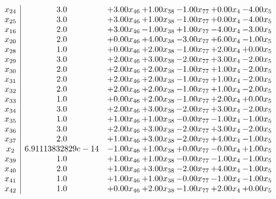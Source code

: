 \documentclass[8pt]{article}
\begin{document}
\[\begin{array}{c| c c@{\hskip 2pt} c@{\hskip 2pt} c@{\hskip 2pt} c@{\hskip 2pt} c@{\hskip 2pt} }
 x_{24}   &  3.0 & +  3.00 x_{46} & +  1.00 x_{38} & -1.00 x_{77} & +  0.00 x_{4} & -4.00 x_{5}\\
 x_{25}   &  3.0 & +  3.00 x_{46} & +  1.00 x_{38} & -1.00 x_{77} & +  0.00 x_{4} & -4.00 x_{5}\\
 x_{16}   &  2.0 & +  3.00 x_{46} & -1.00 x_{38} & +  1.00 x_{77} & -4.00 x_{4} & -3.00 x_{5}\\
 x_{20}   &  2.0 & +  0.00 x_{46} & +  4.00 x_{38} & -3.00 x_{77} & +  6.00 x_{4} & -1.00 x_{5}\\
 x_{28}   &  1.0 & +  0.00 x_{46} & +  2.00 x_{38} & -1.00 x_{77} & +  2.00 x_{4} & +  0.00 x_{5}\\
 x_{29}   &  3.0 & +  2.00 x_{46} & +  3.00 x_{38} & -2.00 x_{77} & +  3.00 x_{4} & -2.00 x_{5}\\
 x_{30}   &  2.0 & +  2.00 x_{46} & +  2.00 x_{38} & -1.00 x_{77} & +  1.00 x_{4} & -2.00 x_{5}\\
 x_{31}   &  2.0 & +  2.00 x_{46} & +  2.00 x_{38} & -1.00 x_{77} & +  1.00 x_{4} & -2.00 x_{5}\\
 x_{32}   &  2.0 & +  2.00 x_{46} & +  2.00 x_{38} & -1.00 x_{77} & +  1.00 x_{4} & -2.00 x_{5}\\
 x_{33}   &  1.0 & +  0.00 x_{46} & +  2.00 x_{38} & -1.00 x_{77} & +  2.00 x_{4} & +  0.00 x_{5}\\
 x_{34}   &  3.0 & +  2.00 x_{46} & +  3.00 x_{38} & -2.00 x_{77} & +  3.00 x_{4} & -2.00 x_{5}\\
 x_{35}   &  1.0 & +  1.00 x_{46} & +  1.00 x_{38} & -0.00 x_{77} & -1.00 x_{4} & -1.00 x_{5}\\
 x_{36}   &  3.0 & +  2.00 x_{46} & +  3.00 x_{38} & -2.00 x_{77} & +  3.00 x_{4} & -2.00 x_{5}\\
 x_{37}   &  2.0 & +  1.00 x_{46} & +  3.00 x_{38} & -2.00 x_{77} & +  4.00 x_{4} & -1.00 x_{5}\\
 x_{2}   &  6.91113832829e-14 & -1.00 x_{46} & +  1.00 x_{38} & +  0.00 x_{77} & -0.00 x_{4} & +  1.00 x_{5}\\
 x_{39}   &  1.0 & +  1.00 x_{46} & +  1.00 x_{38} & -0.00 x_{77} & -1.00 x_{4} & -1.00 x_{5}\\
 x_{40}   &  2.0 & +  1.00 x_{46} & +  3.00 x_{38} & -2.00 x_{77} & +  4.00 x_{4} & -1.00 x_{5}\\
 x_{41}   &  1.0 & +  1.00 x_{46} & +  1.00 x_{38} & -0.00 x_{77} & -1.00 x_{4} & -1.00 x_{5}\\
 x_{42}   &  1.0 & +  0.00 x_{46} & +  2.00 x_{38} & -1.00 x_{77} & +  2.00 x_{4} & +  0.00 x_{5}\\

\end{array}\]
\end{document}
